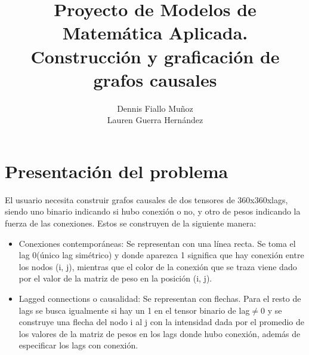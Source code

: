 \documentclass[spanish]{article}
\title{Proyecto de Modelos de Matemática Aplicada. \\Construcción y graficación de grafos causales}
\author{ Dennis Fiallo Muñoz \\ Lauren Guerra Hernández}
\begin{document}
	
\maketitle


\section*{Presentación del problema}

El usuario necesita construir grafos causales de dos tensores de 360x360xlags, siendo uno binario indicando si hubo conexión o no, y otro de pesos indicando la fuerza de las conexiones. Estos se construyen de la siguiente manera:

\begin{itemize}
\item	Conexiones contemporáneas: Se representan con una línea recta. Se toma el lag 0(único lag simétrico) y donde aparezca 1 significa que hay conexión entre los nodos (i, j), mientras que el color de la conexión que se traza viene dado por el valor de la matriz de peso en la posición (i, j).
\item	Lagged connections o causalidad: Se representan con flechas. Para el resto de lags se busca igualmente si hay un 1 en el tensor binario de 
lag$\neq $0 y se construye una flecha del nodo i al j con 
la intensidad dada por el promedio de los valores de la matriz de pesos en los lags donde hubo conexión, además de especificar los lags con conexión.
\end{itemize}
\end{document}

